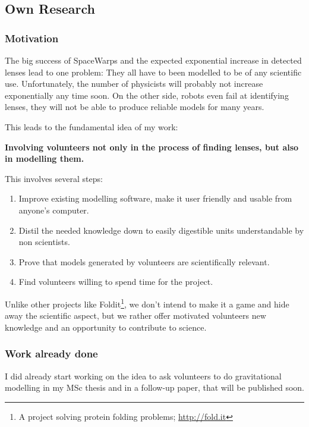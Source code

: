 \documentclass[11pt]{article}
\begin{document}
\subsection{Own Research}

\subsubsection{Motivation}

The big success of SpaceWarps and the expected exponential increase in detected lenses lead to one problem:
They all have to been modelled to be of any scientific use.
Unfortunately, the number of physicists will probably not increase exponentially any time soon.
On the other side, robots even fail at identifying lenses, they will not be able to produce reliable models for many years.

This leads to the fundamental idea of my work:

{\bf Involving volunteers not only in the process of finding lenses, but also in modelling them.}

This involves several steps:

\begin{enumerate}
  \item Improve existing modelling software, make it user friendly and usable from anyone’s computer.
  \item Distil the needed knowledge down to easily digestible units understandable by non scientists.
  \item Prove that models generated by volunteers are scientifically relevant.
  \item Find volunteers willing to spend time for the project.
\end{enumerate}

Unlike other projects like Foldit\footnote{A project solving protein folding problems; \url{http://fold.it}}, we don't intend to make it a game and hide away the scientific aspect, but we rather offer motivated volunteers new knowledge and an opportunity to contribute to science.


\subsubsection{Work already done}

I did already start working on the idea to ask volunteers to do gravitational modelling in my MSc thesis and in a follow-up paper, that will be published soon.
\end{document}
